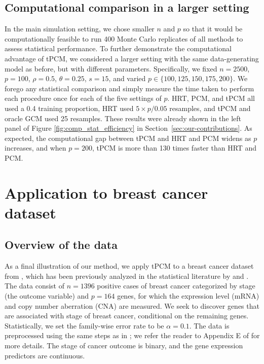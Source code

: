 \documentclass[12pt]{article}
\theoremstyle{definition}
\theoremstyle{remark}
\begin{document}
	\subsection{Computational comparison in a larger setting}
	In the main simulation setting, we chose smaller $n$ and $p$ so that it would be computationally feasible to run 400 Monte Carlo replicates of all methods to assess statistical performance. To further demonstrate the computational advantage of tPCM, we considered a larger setting with the same data-generating model as before, but with different parameters. Specifically, we fixed $n = 2500$, $p = 100$, $\rho = 0.5$, $\theta = 0.25$, $s = 15$, and varied $p \in \{100, 125, 150, 175, 200\}$.  We forego any statistical comparison and simply measure the time taken to perform each procedure once for each of the five settings of $p$. HRT, PCM, and tPCM all used a 0.4 training proportion, HRT used $5 \times p / 0.05$ resamples, and tPCM and oracle GCM used 25 resamples. These results were already shown in the left panel of Figure \ref{fig:comp_stat_efficiency} in Section~\ref{sec:our-contributions}. As expected, the computational gap between tPCM and HRT and PCM widens as $p$ increases, and when $p = 200$, tPCM is more than 130 times faster than HRT and PCM.

\section{Application to breast cancer dataset}
\subsection{Overview of the data}
As a final illustration of our method, we apply tPCM to a breast cancer dataset from \citet{Curtis2012}, which has been previously analyzed in the statistical literature by \citet{Liu2020} and \citet{Li2021c}. The data consist of $n = 1396$ positive cases of breast cancer categorized by stage (the outcome variable) and $p = 164$ genes, for which the expression level (mRNA) and copy number aberration
(CNA) are measured. We seek to discover genes that are associated with stage of breast cancer, conditional on the remaining genes. Statistically, we set the family-wise error rate to be $\alpha = 0.1$. The data is preprocessed using the same steps as in \citet{Liu2020}; we refer the reader to Appendix E of \citet{Liu2020} for more details. The stage of cancer outcome is binary, and the gene expression predictors are continuous.
\end{document}
